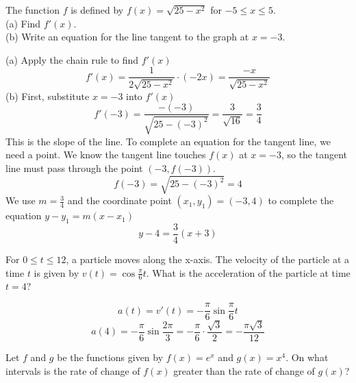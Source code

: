 \begin{Exercise}
    [label=deriv_rules9]
    The function $f$ is defined by $f(x) = \sqrt{25-x^2}$ for $-5 \leq 
    x \leq 5$. \\
    (a) Find $f'(x)$. \\
    (b) Write an equation for the line tangent to the graph at $x = -3$. 
\end{Exercise}
\begin{Answer}
    [ref=deriv_rules9]
    (a) Apply the chain rule to find $f'(x)$ 
    $$f'(x) = \frac{1}{2\sqrt{25 - x^2}} \cdot(-2x) = \frac{-x}{
    \sqrt{25-x^2}}$$
    (b) First, substitute $x=-3$ into $f'(x)$ 
    $$f'(-3) = \frac{-(-3)}{\sqrt{25 - (-3)^2}} = \frac{3}{\sqrt{16}} 
    = \frac{3}{4}$$
    This is the slope of the line. To complete an equation for the 
    tangent line, we need a point. We know the tangent line touches 
    $f(x)$ at $x = -3$, so the tangent line must pass through the 
    point $(-3, f(-3))$. $$f(-3) = \sqrt{25-(-3)^2} = 4$$ We use $m = 
    \frac{3}{4}$ and the coordinate point $(x_1, y_1) = (-3, 4)$ to 
    complete the equation $y - y_1 = m(x - x_1)$ 
    $$y-4 = \frac{3}{4}(x+3)$$
\end{Answer}

\begin{Exercise}
    [label=deriv_rules10]
    For $0 \leq t \leq 12$, a particle moves along the x-axis. The 
    velocity of the particle at a time $t$ is given by $v(t) = 
    \cos{\frac{\pi}{6}t}$. What is the acceleration of the particle 
    at time $t = 4$?
\end{Exercise}
\begin{Answer}
    [ref=deriv_rules10]
    $$a(t) = v'(t) = -\frac{\pi}{6}\sin{\frac{\pi}{6}t}$$
    $$a(4) = -\frac{\pi}{6}\sin{\frac{2\pi}{3}} = 
    -\frac{\pi}{6}\cdot\frac{\sqrt{3}}{2}=-\frac{\pi \sqrt{3}}{12}$$
\end{Answer}

\begin{Exercise}
	Let $f$ and $g$ be the functions given by $f(x) = e^{x}$ and $g(x) = 
	x^4$. On what intervals is the rate of change of $f(x)$ greater than 
	the rate of change of $g(x)$?
\end{Exercise}

